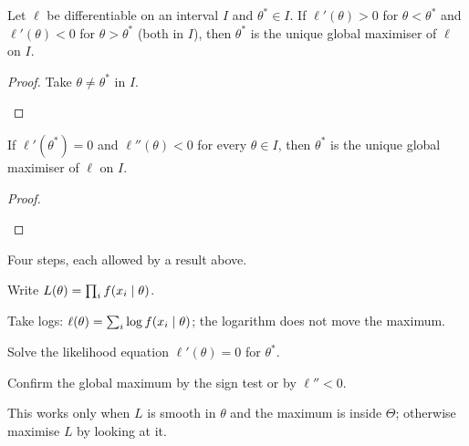 \begin{result}
Let $\ell$ be differentiable on an interval $I$ and $\theta^*\in I$. If $\ell'(\theta)>0$ for $\theta<\theta^*$ and $\ell'(\theta)<0$ for $\theta>\theta^*$ (both in $I$), then $\theta^*$ is the unique global maximiser of $\ell$ on $I$.
\end{result}
\begin{proof}
Take $\theta\ne\theta^*$ in $I$.
\begin{deriv}
\end{deriv}
\end{proof}

\begin{corollary}
If $\ell'(\theta^*)=0$ and $\ell''(\theta)<0$ for every $\theta\in I$, then $\theta^*$ is the unique global maximiser of $\ell$ on $I$.
\end{corollary}
\begin{proof}
\begin{deriv}
\end{deriv}
\end{proof}

\begin{setup}
Four steps, each allowed by a result above.
\begin{steps}
  \item Write $L(\theta)=\prod_i f(x_i\mid\theta)$.
  \item Take logs: $\ell(\theta)=\sum_i\log f(x_i\mid\theta)$; the logarithm does not move the maximum.
  \item Solve the likelihood equation $\ell'(\theta)=0$ for $\theta^*$.
  \item Confirm the global maximum by the sign test or by $\ell''<0$.
\end{steps}
This works only when $L$ is smooth in $\theta$ and the maximum is inside $\Theta$; otherwise maximise $L$ by looking at it.
\end{setup}

